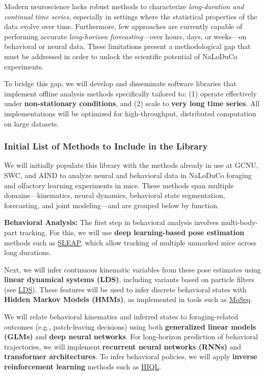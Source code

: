 
Modern neuroscience lacks robust methods to characterize \textit{long-duration
and continual time series}, especially in settings where the statistical
properties of the data evolve over time. Furthermore, few approaches are
currently capable of performing accurate \textit{long-horizon forecasting}—over
hours, days, or weeks—on behavioral or neural data. These limitations present a
methodological gap that must be addressed in order to unlock the scientific
potential of NaLoDuCo experiments.

To bridge this gap, we will develop and disseminate software libraries that
implement offline analysis methods specifically tailored to: (1) operate
effectively under \textbf{non-stationary conditions}, and (2) scale to
\textbf{very long time series}. All implementations will be optimized for
high-throughput, distributed computation on large datasets.

\subsubsection*{Initial List of Methods to Include in the Library}
\label{sec:initialListOfMethods}

We will initially populate this library with the methods already in use at
GCNU, SWC, and AIND to analyze neural and behavioral data in NaLoDuCo foraging
and olfactory learning experiments in mice. These methods span multiple
domains—kinematics, neural dynamics, behavioral state segmentation,
forecasting, and joint modeling—and are grouped below by function.

\vspace{1em}
\noindent\textbf{Behavioral Analysis:}  
The first step in behavioral analysis involves multi-body-part tracking. For
this, we will use \textbf{deep learning-based pose estimation} methods such as
\href{https://github.com/talmolab/sleap}{SLEAP}, which allow tracking of
multiple unmarked mice across long durations.

Next, we will infer continuous kinematic variables from these pose estimates
using \textbf{linear dynamical systems (LDS)}, including variants based on
particle filters (see \href{https://github.com/joacorapela/lds}{LDS}). These
features will be used to infer discrete behavioral states with \textbf{Hidden
Markov Models (HMMs)}, as implemented in tools such as
\href{https://dattalab.github.io/moseq2-website/index.html}{MoSeq}.

We will relate behavioral kinematics and inferred states to foraging-related
outcomes (e.g., patch-leaving decisions) using both \textbf{generalized linear
models (GLMs)} and \textbf{deep neural networks}. For long-horizon prediction
of behavioral trajectories, we will implement \textbf{recurrent neural networks
(RNNs)} and \textbf{transformer architectures}. To infer behavioral policies,
we will apply \textbf{inverse reinforcement learning} methods such as
\href{https://github.com/haozhu10015/hiql}{HIQL}.

